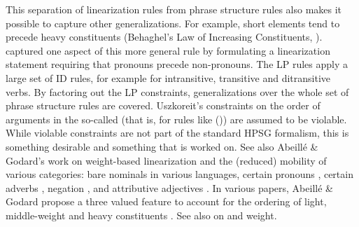 \documentclass[output=paper
	        ,collection
	        ,collectionchapter
 	        ,biblatex
                ,babelshorthands
                ,newtxmath
                ,draftmode
                ,colorlinks, citecolor=brown
]{langscibook}
\begin{document}
This separation of linearization rules from phrase structure rules also makes it possible to capture
other generalizations. For example, short elements tend to precede heavy constituents (Behaghel's
Law of Increasing Constituents, \citealp[]{Behaghel09a}). \citet[Chapter~5]{Uszkoreit87a} captured one aspect of this more general rule by
formulating a linearization statement requiring that pronouns precede non-pronouns. The LP rules
apply a large set of ID rules, for example for intransitive, transitive and ditransitive verbs. By
factoring out the LP constraints, generalizations over the whole set of phrase structure rules are covered.
Uszkoreit's constraints on the order of arguments in the so-called \mf (that is, for rules like ()) are
assumed to be violable. While violable constraints are not part of the standard HPSG formalism, this
is something desirable and something that is worked on. See also Abeillé \& Godard's work on
weight-based linearization and the (reduced) mobility of various categories: bare nominals in
various languages, certain pronouns \citep{AG99a-u}, certain adverbs
\citep{AG2001a-u}, negation \citep{AG97a-u,AG2004a-u}, and attributive adjectives
\citep{AG99b-u}. In various papers, Abeillé \& Godard propose a three valued  feature
to account for the ordering of light, middle-weight and heavy constituents \citep{AG2000a,AG2004a-u}. See
also  on  and weight.
\end{document}
